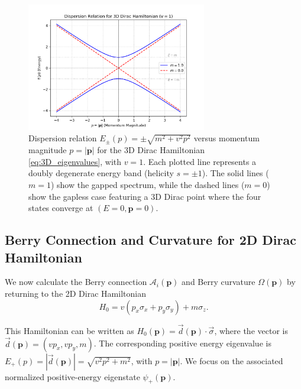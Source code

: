 \documentclass[11pt]{article}
\begin{document}
\begin{figure}[htbp]
    \centering
    \includegraphics[width=0.7\textwidth]{3d_dirac_dispersion.png} %
    \caption{Dispersion relation $E_{\pm}(p) = \pm \sqrt{m^2 + v^2 p^2}$ versus momentum magnitude $p=|\mathbf{p}|$ for the 3D Dirac Hamiltonian \eqref{eq:3D_eigenvalues}, with $v=1$. Each plotted line represents a doubly degenerate energy band (helicity $s=\pm 1$). The solid lines ($m=1$) show the gapped spectrum, while the dashed lines ($m=0$) show the gapless case featuring a 3D Dirac point where the four states converge at $(E=0, \mathbf{p}=0)$.}
    \label{fig:3D_dispersion} %
\end{figure}


\subsection{Berry Connection and Curvature for 2D Dirac Hamiltonian}

We now calculate the Berry connection $\mathcal{A}_i(\mathbf{p})$ and Berry curvature $\Omega(\mathbf{p})$ by returning to the 2D Dirac Hamiltonian $$H_0 = v(p_x \sigma_x + p_y \sigma_y) + m \sigma_z .$$ 

This Hamiltonian can be written as $H_0(\mathbf{p}) = \vec{d}(\mathbf{p}) \cdot \vec{\sigma}$, where the vector is $\vec{d}(\mathbf{p}) = (v p_x, v p_y, m)$. The corresponding positive energy eigenvalue is $E_+(p) = |\vec{d}(\mathbf{p})| = \sqrt{v^2 p^2 + m^2}$, with $p = |\mathbf{p}|$. We focus on the associated normalized positive-energy eigenstate $\psi_+(\mathbf{p})$.
\end{document}
